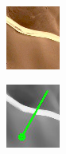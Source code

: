 \begin{figure}[htbp]
	\begin{subfigure}[b]{0.1\textwidth}
		\centering
		\includegraphics[width=\linewidth]{figures/skeletoncoast_patch}
		\caption{}
		\label{fig:skeletoncoast_patch}
	\end{subfigure}
	\begin{subfigure}[b]{0.1\textwidth}
		\centering
		\includegraphics[width=\linewidth]{figures/skeletoncoast_patch_arrow}

\end{subfigure}
\end{figure}
